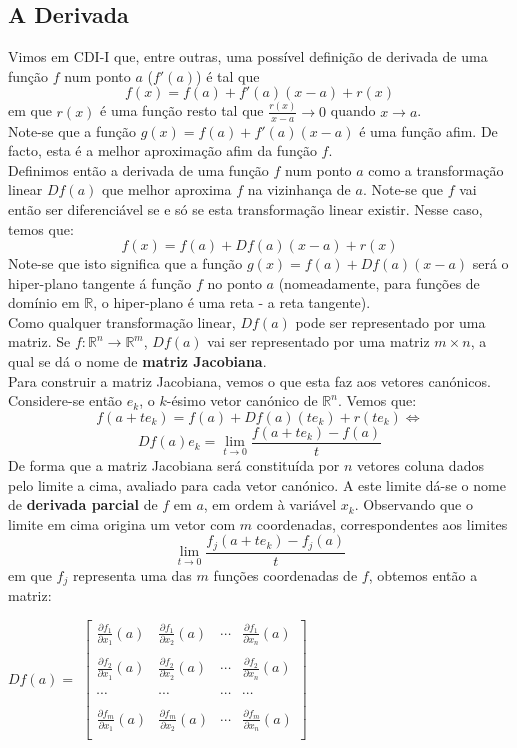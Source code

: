 \documentclass{article}
\begin{document}
\subsection{A Derivada}
Vimos em CDI-I que, entre outras, uma possível definição de derivada de uma função $f$ num ponto $a$ ($f'(a)$) é tal que 
$$
f(x) = f(a) + f'(a)(x-a) + r(x)
$$
em que $r(x)$ é uma função resto tal que $\frac{r(x)}{x-a} \to 0$ quando $x \to a$.\\
Note-se que a função $g(x) = f(a) + f'(a)(x-a)$ é uma função afim. De facto, esta é a melhor aproximação afim da função $f$.\\ 
Definimos então a derivada de uma função $f$ num ponto $a$ como a transformação linear $Df(a)$ que melhor aproxima $f$ na vizinhança de $a$. Note-se que $f$ vai então ser diferenciável se e só se esta transformação linear existir. Nesse caso, temos que:
$$
f(x) = f(a) + Df(a)(x-a) + r(x)
$$
Note-se que isto significa que a função $g(x) = f(a) + Df(a)(x-a)$ será o hiper-plano tangente á função $f$ no ponto $a$ (nomeadamente, para funções de domínio em $\mathbb{R}$, o hiper-plano é uma reta - a reta tangente).\\
Como qualquer transformação linear, $Df(a)$ pode ser representado por uma matriz. Se $f: \mathbb{R}^n \to \mathbb{R}^m$, $Df(a)$ vai ser representado por uma matriz $m \times n$, a qual se dá o nome de \textbf{matriz Jacobiana}.\\
Para construir a matriz Jacobiana, vemos o que esta faz aos vetores canónicos. Considere-se então $e_k$, o $k$-ésimo vetor canónico de $\mathbb{R}^n$. Vemos que:
$$
f(a + te_k) = f(a) + Df(a)(te_k) + r(te_k) \Leftrightarrow
$$
$$
Df(a)e_k = \lim_{t \to 0} \frac{f(a + te_k)-f(a)}{t}
$$
De forma que a matriz Jacobiana será constituída por $n$ vetores coluna dados pelo limite a cima, avaliado para cada vetor canónico. A este limite dá-se o nome de \textbf{derivada parcial} de $f$ em $a$, em ordem à variável $x_k$. Observando que o limite em cima origina um vetor com $m$ coordenadas, correspondentes aos limites
$$
\lim_{t \to 0} \frac{f_j(a + te_k)-f_j(a)}{t}
$$
em que $f_j$ representa uma das $m$ funções coordenadas de $f$, obtemos então a matriz:\\
\begin{center}
$Df(a) = $
$\begin{bmatrix}
	\frac{\partial f_1}{\partial x_1}(a) & \frac{\partial f_1}{\partial x_2}(a) & \cdots & 	\frac{\partial f_1}{\partial x_n}(a) \\
	\\
	\frac{\partial f_2}{\partial x_1}(a) & \frac{\partial f_2}{\partial x_2}(a) & \cdots & 	\frac{\partial f_2}{\partial x_n}(a) \\
	\\
	\cdots & \cdots & \cdots & \cdots \\
	\\
	\frac{\partial f_m}{\partial x_1}(a) & \frac{\partial f_m}{\partial x_2}(a) & \cdots & 	\frac{\partial f_m}{\partial x_n}(a) \\
\end{bmatrix}$
\end{center}
\end{document}
